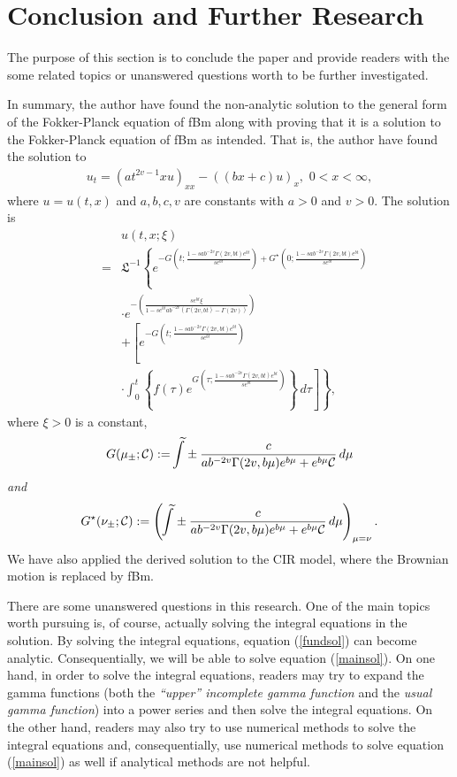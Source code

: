 \documentclass[preprint, 12pt]{elsarticle}
\numberwithin{equation}{section}
\theoremstyle{plain}
\theoremstyle{remark}
\newcommand{\assign}{:=}
\newcommand{\nocomma}{}
\begin{document}
\section{Conclusion and Further Research} \label{conclusion}

The purpose of this section is to conclude the paper and provide readers with the  some related topics or unanswered questions worth to be further investigated.

In summary, the author have found the non-analytic solution to the general
form of the Fokker-Planck equation of fBm along with proving that it is a
solution to the Fokker-Planck equation of fBm as intended. That is, the author have found the solution to
\begin{eqnarray}
  u_t = (a t^{2 v - 1} x u)_{x x} - ((b x + c) u)_x, \,\, 0 < x < \infty, 
\end{eqnarray}
where $u = u (t, x)$ and $a, b, c, v$ are constants with $a>0$ and $v > 0$. The solution is
\begin{eqnarray}
& & u (t, x ; \xi) \\
& = & \mathfrak{L}^{- 1} \left\{ e^{- G \left( t ; \frac{1 - s a b^{- 2 v} \Gamma (2 v \nocomma, b t) e^{b t}}{s e^{bt}} \right) + G^{\star} \left( 0 ; \frac{1 - s a b^{- 2 v} \Gamma (2 v \nocomma, bt)e^{bt}}{s e^{bt}} \right)} \right. \nonumber \\ 
& & \cdot e^{- \left( \frac{s e^{bt} \xi}{1 - s e^{bt} a b^{- 2 v}  (\Gamma (2 v \nocomma, b t) - \Gamma (2 v \nocomma))} \right)} \nonumber\\
&  & + \left[e^{- G \left( t ; \frac{1 - s a b^{- 2 v} \Gamma (2 v \nocomma, b t) e^{b t}}{s e^{bt}} \right)}\right. \nonumber\\
& & \left. \left. \cdot \int_0^t \left\{ f (\tau) e^{G \left( \tau ; \frac{1 - s a b^{- 2 v} \Gamma (2 v \nocomma, b t) e^{b t}}{s e^{bt}} \right)} \right\}\, d \tau\right] \right\}\nonumber, 
\end{eqnarray}
where $\xi > 0$ is a constant,
\[ G (\mu_{\pm} ; \mathcal{C}) \assign \kern6pt\widetilde{\kern-7pt\int} \pm \frac{c}{a b^{- 2 v} \Gamma (2 v, b \mu) e^{b \mu} +e^{b\mu} \mathcal{C}}\, d \mu\]
\emph{and}
\[G^{\star} (\nu_{\pm} ; \mathcal{C}) \assign \left( \kern6pt\widetilde{\kern-7pt\int} \pm \frac{c}{a b^{- 2 v} \Gamma (2 v, b \mu) e^{b \mu} +e^{b\mu} \mathcal{C}}\, d \mu \right)_{\mu = \nu}. \]
We have also applied the derived solution to the CIR model, where the Brownian motion is replaced by fBm.

There are some unanswered questions in this research. One of the main topics worth pursuing is, of course, actually solving the integral equations in the solution. By solving the integral equations, equation (\ref{fundsol}) can become analytic. Consequentially, we will be able to solve equation (\ref{mainsol}). On one hand, in order to solve the integral equations, readers may try to expand the gamma functions (both the \textit{``upper'' incomplete gamma function} and the \textit{usual gamma function}) into a power series and then solve the integral equations. On the other hand, readers may also try to use numerical methods to solve the integral equations and, consequentially, use numerical methods to solve equation (\ref{mainsol}) as well if analytical methods are not helpful.
\end{document}
